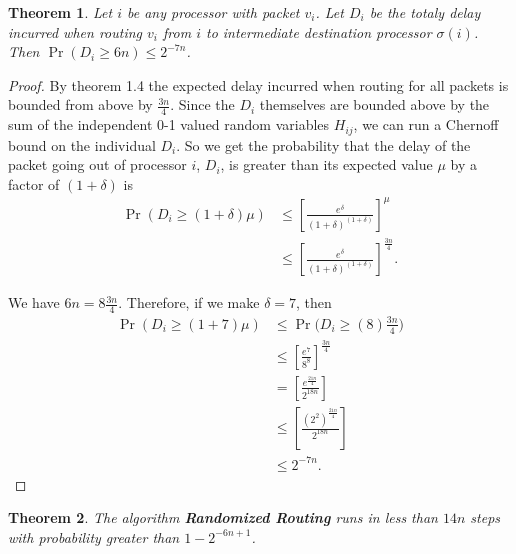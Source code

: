 \documentclass[psamsfonts, 10pt]{amsart}
\newtheorem{thm}{Theorem}[section]
\theoremstyle{definition}
\theoremstyle{remark}
\numberwithin{equation}{section}
\begin{document}
\begin{thm}
Let $i$ be any processor with packet $v_i$. Let $D_i$ be the totaly delay incurred when routing $v_i$ from $i$ to intermediate destination processor $\sigma(i)$. Then $\Pr(D_i \geq 6n) \leq 2^{-7n}$.
\end{thm}

\begin{proof}
By theorem 1.4 the expected delay incurred when routing for all packets is bounded from above by $\frac{3n}{4}$. Since the $D_i$ themselves are bounded above by the sum of the independent 0-1 valued random variables $H_{ij}$, we can run a Chernoff bound on the individual $D_i$. So we get the probability that the delay of the packet going out of processor $i$, $D_i$, is greater than its expected value $\mu$ by a factor of $(1 + \delta)$ is
\begin{equation}
\begin{aligned}
\Pr(D_i \geq (1 + \delta)\mu) &\leq \left[ \frac{e^{\delta}}{(1 + \delta)^{(1 + \delta)}} \right]^{\mu}\\
&\leq \left[ \frac{e^{\delta}}{(1 + \delta)^{(1 + \delta)}} \right]^{\frac{3n}{4}}.
\end{aligned}
\end{equation}

We have $6n = 8\frac{3n}{4}$. Therefore, if we make $\delta = 7$, then 
\begin{equation}
\begin{aligned}
\Pr(D_i \geq (1 + 7)\mu) &\leq \Pr\Big(D_i \geq (8)\frac{3n}{4}\Big)\\
&\leq \left[ \frac{e^{7}}{8^{8}} \right]^{\frac{3n}{4}}\\
&= \left[ \frac{e^{\frac{21n}{4}}}{2^{18n}} \right]\\
&\leq  \left[ \frac{(2^2)^{\frac{21n}{4}}}{2^{18n}} \right]\\
&\leq 2^{-7n}.
\end{aligned}
\end{equation}
\end{proof}

\begin{thm}
The algorithm {\bf Randomized Routing} runs in less than $14n$ steps with probability greater than $1- 2^{-6n +1}$.
\end{thm}
\end{document}
